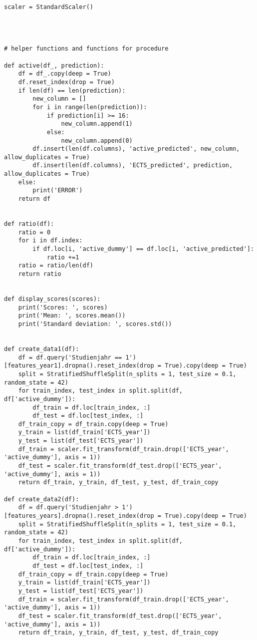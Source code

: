 \begin{lstlisting}
scaler = StandardScaler()




# helper functions and functions for procedure

def active(df_, prediction):
    df = df_.copy(deep = True)
    df.reset_index(drop = True)
    if len(df) == len(prediction):
        new_column = []
        for i in range(len(prediction)):
            if prediction[i] >= 16:
                new_column.append(1)
            else:
                new_column.append(0)
        df.insert(len(df.columns), 'active_predicted', new_column, allow_duplicates = True)
        df.insert(len(df.columns), 'ECTS_predicted', prediction, allow_duplicates = True)
    else:
        print('ERROR')
    return df

    
def ratio(df):
    ratio = 0
    for i in df.index:
        if df.loc[i, 'active_dummy'] == df.loc[i, 'active_predicted']:
            ratio +=1
    ratio = ratio/len(df)
    return ratio


def display_scores(scores):
    print('Scores: ', scores)
    print('Mean: ', scores.mean())
    print('Standard deviation: ', scores.std())


def create_data1(df):
    df = df.query('Studienjahr == 1')[features_year1].dropna().reset_index(drop = True).copy(deep = True)
    split = StratifiedShuffleSplit(n_splits = 1, test_size = 0.1, random_state = 42)
    for train_index, test_index in split.split(df, df['active_dummy']):
        df_train = df.loc[train_index, :]
        df_test = df.loc[test_index, :]
    df_train_copy = df_train.copy(deep = True)
    y_train = list(df_train['ECTS_year'])
    y_test = list(df_test['ECTS_year'])
    df_train = scaler.fit_transform(df_train.drop(['ECTS_year', 'active_dummy'], axis = 1))
    df_test = scaler.fit_transform(df_test.drop(['ECTS_year', 'active_dummy'], axis = 1))
    return df_train, y_train, df_test, y_test, df_train_copy

def create_data2(df):
    df = df.query('Studienjahr > 1')[features_years].dropna().reset_index(drop = True).copy(deep = True)
    split = StratifiedShuffleSplit(n_splits = 1, test_size = 0.1, random_state = 42)
    for train_index, test_index in split.split(df, df['active_dummy']):
        df_train = df.loc[train_index, :]
        df_test = df.loc[test_index, :]
    df_train_copy = df_train.copy(deep = True)
    y_train = list(df_train['ECTS_year'])
    y_test = list(df_test['ECTS_year'])
    df_train = scaler.fit_transform(df_train.drop(['ECTS_year', 'active_dummy'], axis = 1))
    df_test = scaler.fit_transform(df_test.drop(['ECTS_year', 'active_dummy'], axis = 1))
    return df_train, y_train, df_test, y_test, df_train_copy



\end{lstlisting}
